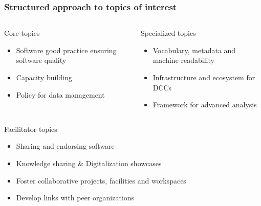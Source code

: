 \documentclass{beamer}
\begin{document}
    \begin{frame}
        \frametitle{Structured approach to topics of interest}
        \begin{columns}[T]
            \begin{alertblock}{Core topics}
                \small
                \begin{itemize}

                    \item Software good practice ensuring software quality
                    \item Capacity building
                    \item Policy for data management
                \end{itemize}
            \end{alertblock}
            \begin{exampleblock}{Specialized topics}
                \small
                \begin{itemize}
                    \item Vocabulary, metadata and machine readability
                    \item Infrastructure and ecosystem for DCCs
                    \item Framework for advanced analysis
                \end{itemize}
            \end{exampleblock}
        \end{columns}
        \centering
        \begin{minipage}{0.95\textwidth}
            \begin{block}{Facilitator topics}
                \small
                \begin{itemize}
                    \item Sharing and endorsing software
                    \item Knowledge sharing \& Digitalization showcases
                    \item Foster collaborative projects, facilities and workspaces
                    \item Develop links with peer organizations
                \end{itemize}
            \end{block}
        \end{minipage}
    \end{frame}
\end{document}

